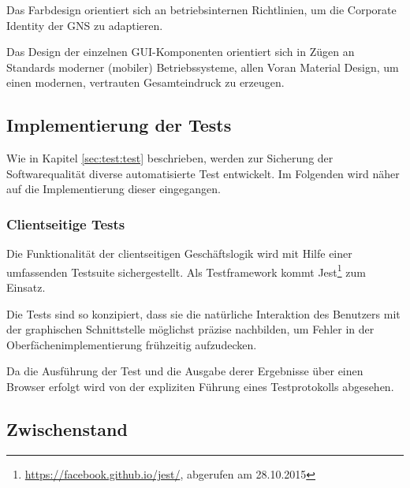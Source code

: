 \documentclass[12pt, xcolor=dvipsnames]{scrartcl}
\begin{document}
Das Farbdesign orientiert sich an betriebsinternen Richtlinien, um die Corporate Identity der GNS zu adaptieren.

Das Design der einzelnen GUI-Komponenten orientiert sich in Zügen an Standards moderner (mobiler) Betriebssysteme, allen Voran Material Design, um einen modernen, vertrauten Gesamteindruck zu erzeugen.

\subsection{Implementierung der Tests}

Wie in Kapitel \ref{sec:test:test} beschrieben, werden zur Sicherung der Softwarequalität diverse automatisierte Test entwickelt. Im Folgenden wird näher auf die Implementierung dieser eingegangen.


\subsubsection*{Clientseitige Tests}

Die Funktionalität der clientseitigen Geschäftslogik wird mit Hilfe einer umfassenden Testsuite sichergestellt. Als Testframework kommt
Jest\footnote{\url{https://facebook.github.io/jest/}, abgerufen am 28.10.2015}
zum Einsatz.

Die Tests sind so konzipiert, dass sie die natürliche Interaktion des Benutzers mit der graphischen Schnittstelle möglichst präzise nachbilden, um Fehler in der Oberfächenimplementierung frühzeitig aufzudecken.

Da die Ausführung der Test und die Ausgabe derer Ergebnisse über einen Browser erfolgt wird von der expliziten Führung eines Testprotokolls abgesehen.

\subsection{Zwischenstand}
\end{document}
